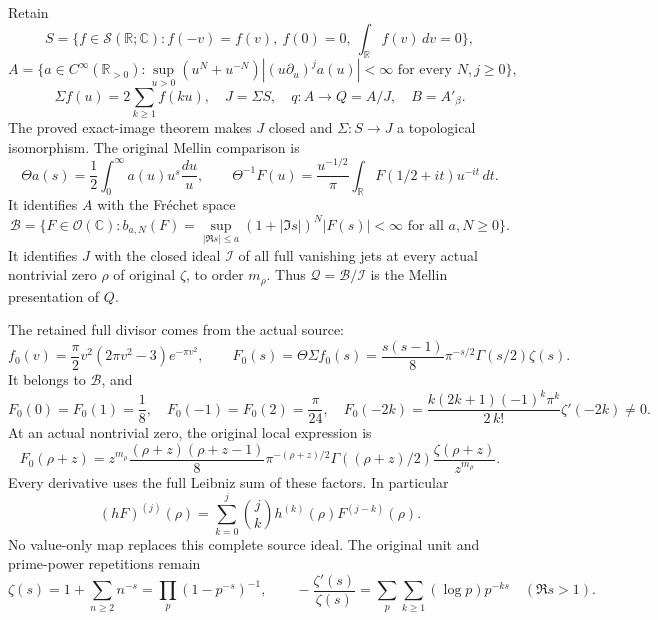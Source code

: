 Retain \[
S=\{f\in\mathcal S(\mathbb R;\mathbb C):
f(-v)=f(v),\ f(0)=0,\ \int_{\mathbb R}f(v)\,dv=0\},
\] \[
A=\{a\in C^\infty(\mathbb R_{>0}):
\sup_{u>0}(u^N+u^{-N})|(u\partial_u)^ja(u)|<\infty
\text{ for every }N,j\ge0\},
\] \[
\Sigma f(u)=2\sum_{k\ge1}f(ku),\quad J=\Sigma S,\quad
q:A\to Q=A/J,\quad B=A'_\beta .
\tag{ADM1.1}
\] The proved exact-image theorem makes \(J\) closed and
\(\Sigma:S\to J\) a topological isomorphism. The original Mellin
comparison is \[
\Theta a(s)=\frac12\int_0^\infty a(u)u^s\frac{du}{u},\qquad
\Theta^{-1}F(u)=\frac{u^{-1/2}}{\pi}
\int_{\mathbb R}F(1/2+it)u^{-it}\,dt.
\tag{ADM1.2}
\] It identifies \(A\) with the Fréchet space \[
\mathcal B=\{F\in\mathcal O(\mathbb C):
b_{a,N}(F)=\sup_{|\Re s|\le a}(1+|\Im s|)^N|F(s)|<\infty
\text{ for all }a,N\ge0\}.
\] It identifies \(J\) with the closed ideal \(\mathcal I\) of all full
vanishing jets at every actual nontrivial zero \(\rho\) of original
\(\zeta\), to order \(m_\rho\). Thus
\(\mathcal Q=\mathcal B/\mathcal I\) is the Mellin presentation of
\(Q\).

The retained full divisor comes from the actual source: \[
f_0(v)=\frac{\pi}{2}v^2(2\pi v^2-3)e^{-\pi v^2},\qquad
F_0(s)=\Theta\Sigma f_0(s)
=\frac{s(s-1)}8\pi^{-s/2}\Gamma(s/2)\zeta(s).
\tag{ADM1.3}
\] It belongs to \(\mathcal B\), and \[
F_0(0)=F_0(1)=\frac18,\quad F_0(-1)=F_0(2)=\frac{\pi}{24},\quad
F_0(-2k)=\frac{k(2k+1)(-1)^k\pi^k}{2\,k!}\zeta'(-2k)\ne0.
\tag{ADM1.4}
\] At an actual nontrivial zero, the original local expression is \[
F_0(\rho+z)=z^{m_\rho}
\frac{(\rho+z)(\rho+z-1)}8\pi^{-(\rho+z)/2}
\Gamma((\rho+z)/2)\frac{\zeta(\rho+z)}{z^{m_\rho}}.
\tag{ADM1.5}
\] Every derivative uses the full Leibniz sum of these factors. In
particular \[
(hF)^{(j)}(\rho)=\sum_{k=0}^j\binom jk
h^{(k)}(\rho)F^{(j-k)}(\rho).
\tag{ADM1.6}
\] No value-only map replaces this complete source ideal. The original
unit and prime-power repetitions remain \[
\zeta(s)=1+\sum_{n\ge2}n^{-s}=\prod_p(1-p^{-s})^{-1},\qquad
-\frac{\zeta'(s)}{\zeta(s)}
=\sum_p\sum_{k\ge1}(\log p)p^{-ks}\quad(\Re s>1).
\tag{ADM1.7}
\]

